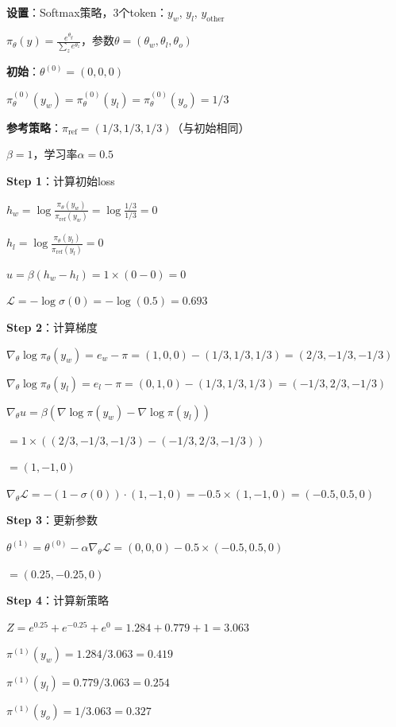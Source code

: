 \documentclass[11pt,a4paper]{article}
\theoremstyle{definition}
\begin{document}
\begin{calculation}
\textbf{设置}：Softmax策略，3个token：$y_w$, $y_l$, $y_{\text{other}}$

$\pi_\theta(y) = \frac{e^{\theta_y}}{\sum_z e^{\theta_z}}$，参数$\theta = (\theta_w, \theta_l, \theta_o)$

\textbf{初始}：$\theta^{(0)} = (0, 0, 0)$

$\pi_\theta^{(0)}(y_w) = \pi_\theta^{(0)}(y_l) = \pi_\theta^{(0)}(y_o) = 1/3$

\textbf{参考策略}：$\pi_{\text{ref}} = (1/3, 1/3, 1/3)$（与初始相同）

$\beta = 1$，学习率$\alpha = 0.5$

\textbf{Step 1}：计算初始loss

$h_w = \log \frac{\pi_\theta(y_w)}{\pi_{\text{ref}}(y_w)} = \log \frac{1/3}{1/3} = 0$

$h_l = \log \frac{\pi_\theta(y_l)}{\pi_{\text{ref}}(y_l)} = 0$

$u = \beta(h_w - h_l) = 1 \times (0 - 0) = 0$

$\mathcal{L} = -\log \sigma(0) = -\log(0.5) = 0.693$

\textbf{Step 2}：计算梯度

$\nabla_\theta \log \pi_\theta(y_w) = e_w - \pi = (1, 0, 0) - (1/3, 1/3, 1/3) = (2/3, -1/3, -1/3)$

$\nabla_\theta \log \pi_\theta(y_l) = e_l - \pi = (0, 1, 0) - (1/3, 1/3, 1/3) = (-1/3, 2/3, -1/3)$

$\nabla_\theta u = \beta(\nabla \log \pi(y_w) - \nabla \log \pi(y_l))$

$= 1 \times ((2/3, -1/3, -1/3) - (-1/3, 2/3, -1/3))$

$= (1, -1, 0)$

$\nabla_\theta \mathcal{L} = -(1 - \sigma(0)) \cdot (1, -1, 0) = -0.5 \times (1, -1, 0) = (-0.5, 0.5, 0)$

\textbf{Step 3}：更新参数

$\theta^{(1)} = \theta^{(0)} - \alpha \nabla_\theta \mathcal{L} = (0, 0, 0) - 0.5 \times (-0.5, 0.5, 0)$

$= (0.25, -0.25, 0)$

\textbf{Step 4}：计算新策略

$Z = e^{0.25} + e^{-0.25} + e^{0} = 1.284 + 0.779 + 1 = 3.063$

$\pi^{(1)}(y_w) = 1.284 / 3.063 = 0.419$

$\pi^{(1)}(y_l) = 0.779 / 3.063 = 0.254$

$\pi^{(1)}(y_o) = 1 / 3.063 = 0.327$


\end{calculation}
\end{document}

